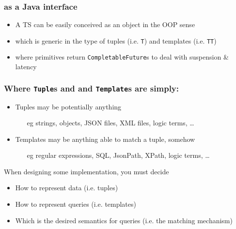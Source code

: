 \documentclass[presentation]{beamer}\mode<presentation>{\usetheme{AMSCesenaPurpleAndGold}}
\begin{document}
\begin{frame}%
	\frametitle{\linda{} as a Java interface}
	
	\begin{itemize}
		\item A TS can be easily conceived as an \alert{object} in the OOP sense
		
		\vfill
		
		\item which is generic in the type of tuples (i.e. \texttt{\alert{T}}) and templates (i.e. \texttt{\alert{TT}})
		
		\vfill
		
		\item where primitives return \alert{\texttt{CompletableFuture}s} to deal with suspension \& latency
	\end{itemize}
	
	\vfill
	
	
\end{frame}

\begin{frame}%
\frametitle{Where \texttt{Tuple}s and and \texttt{Template}s are simply:}

	\columsHH{
		
	}{
		
	}
	
	\begin{itemize}
		\item Tuples may be potentially anything
		\begin{itemize}
			\item[eg] strings, objects, JSON files, XML files, logic terms, \ldots
		\end{itemize}
		
		\item Templates may be anything able to match a tuple, somehow
		\begin{itemize}
			\item[eg] regular expressions, SQL, JsonPath, XPath, logic terms, \ldots
		\end{itemize}
	\end{itemize}
	
	\vfill
	
	\begin{block}{When designing some \linda{} implementation, you must decide}
		\begin{itemize}
			\item How to represent data (i.e. \alert{tuples})
			\item How to represent queries (i.e. \alert{templates})
			\item Which is the desired semantics for queries (i.e. the \alert{matching} mechanism)
		\end{itemize}
	\end{block}

\end{frame}
\end{document}
